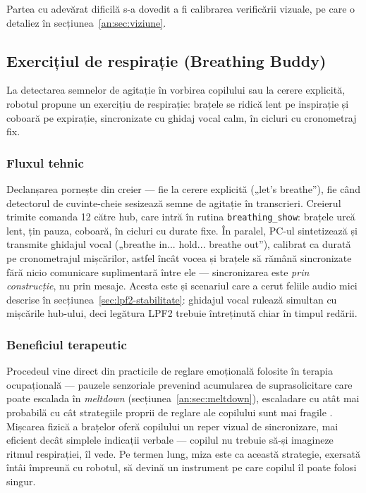 Partea cu adevărat dificilă s-a dovedit a fi calibrarea verificării vizuale, pe care o detaliez în secțiunea~\ref{an:sec:viziune}.

\subsection{Exercițiul de respirație (Breathing Buddy)}

La detectarea semnelor de agitație în vorbirea copilului sau la cerere explicită, robotul propune un exercițiu de respirație: brațele se ridică lent pe inspirație și coboară pe expirație, sincronizate cu ghidaj vocal calm, în cicluri cu cronometraj fix.

\subsubsection*{Fluxul tehnic}
Declanșarea pornește din creier — fie la cerere explicită („let's breathe”), fie când detectorul de cuvinte-cheie sesizează semne de agitație în transcrieri. Creierul trimite comanda 12 către hub, care intră în rutina \texttt{breathing\_show}: brațele urcă lent, țin pauza, coboară, în cicluri cu durate fixe. În paralel, PC-ul sintetizează și transmite ghidajul vocal („breathe in... hold... breathe out”), calibrat ca durată pe cronometrajul mișcărilor, astfel încât vocea și brațele să rămână sincronizate fără nicio comunicare suplimentară între ele — sincronizarea este \emph{prin construcție}, nu prin mesaje. Acesta este și scenariul care a cerut feliile audio mici descrise în secțiunea~\ref{sec:lpf2-stabilitate}: ghidajul vocal rulează simultan cu mișcările hub-ului, deci legătura LPF2 trebuie întreținută chiar în timpul redării.

\subsubsection*{Beneficiul terapeutic}
Procedeul vine direct din practicile de reglare emoțională folosite în terapia ocupațională — pauzele senzoriale prevenind acumularea de suprasolicitare care poate escalada în \emph{meltdown} (secțiunea~\ref{an:sec:meltdown}), escaladare cu atât mai probabilă cu cât strategiile proprii de reglare ale copilului sunt mai fragile \cite{mazefsky2013}. Mișcarea fizică a brațelor oferă copilului un reper vizual de sincronizare, mai eficient decât simplele indicații verbale — copilul nu trebuie să-și imagineze ritmul respirației, îl vede. Pe termen lung, miza este ca această strategie, exersată întâi împreună cu robotul, să devină un instrument pe care copilul îl poate folosi singur.


